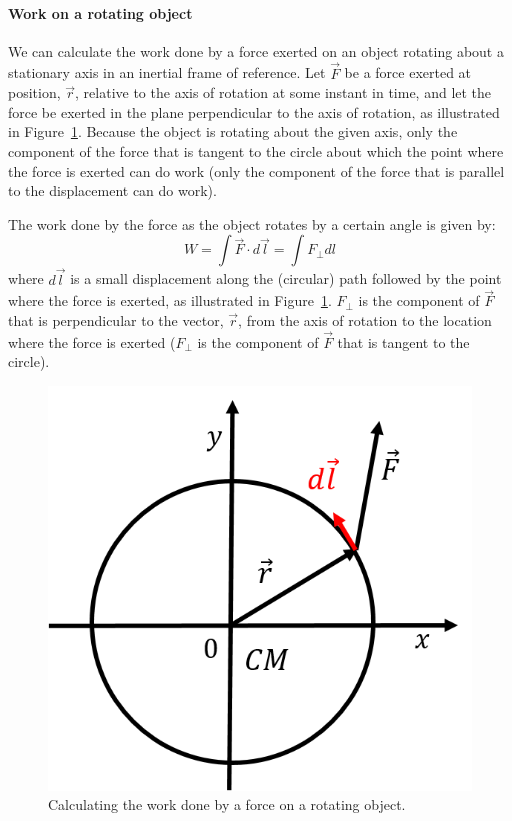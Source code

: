 \paragraph{Work on a rotating object}

We can calculate the work done by a force exerted on an object rotating about a stationary axis in an inertial frame of reference. Let $\vec F$ be a force exerted at position, $\vec r$, relative to the axis of rotation at some instant in time, and let the force be exerted in the plane perpendicular to the axis of rotation, as illustrated in Figure~\ref{fig:angularmomentumrolling:work}. Because the object is rotating about the given axis, only the component of the force that is tangent to the circle about which the point where the force is exerted can do work (only the component of the force that is parallel to the displacement can do work).

The work done by the force as the object rotates by a certain angle is given by:
\begin{equation}
W = \int \vec F \cdot d\vec l = \int F_\perp dl
\end{equation}
where $d\vec l$ is a small displacement along the (circular) path followed by the point where the force is exerted, as illustrated in Figure~\ref{fig:angularmomentumrolling:work}. $F_\perp$ is the component of $\vec F$ that is perpendicular to the vector, $\vec r$, from the axis of rotation to the location where the force is exerted ($F_\perp$ is the component of $\vec F$ that is tangent to the circle).

\begin{figure}[!htbp]
\centering
\includegraphics[width=0.4\linewidth]{files/work-84fbe3453bb9868e829beb7d99b979d9.png}
\caption[]{Calculating the work done by a force on a rotating object.}
\label{fig:angularmomentumrolling:work}
\end{figure}

